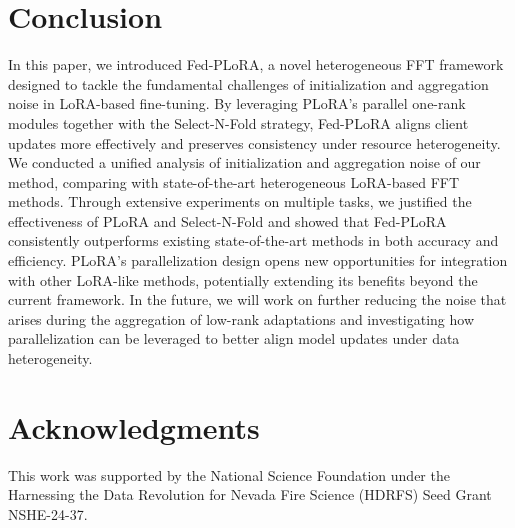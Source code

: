 \documentclass{article} %
\begin{document}
\section{Conclusion}

In this paper, we introduced Fed-PLoRA, a novel heterogeneous FFT framework designed to tackle the fundamental challenges of initialization and aggregation noise in LoRA-based fine-tuning. By leveraging PLoRA’s parallel one-rank modules together with the Select-N-Fold strategy, Fed-PLoRA aligns client updates more effectively and preserves consistency under resource heterogeneity. We conducted a unified analysis of initialization and aggregation noise of our method, comparing with state-of-the-art heterogeneous LoRA-based FFT methods. 
Through extensive experiments on multiple tasks, we justified the effectiveness of PLoRA and Select-N-Fold and showed that Fed-PLoRA consistently outperforms existing state-of-the-art methods in both accuracy and efficiency. PLoRA’s parallelization design opens new opportunities for integration with other LoRA-like methods, potentially extending its benefits beyond the current framework. In the future, we will work on further reducing the noise that arises during the aggregation of low-rank adaptations and investigating how parallelization can be leveraged to better align model updates under data heterogeneity. %


\section*{Acknowledgments}
This work was supported by the National Science Foundation under the Harnessing the Data Revolution for Nevada Fire Science (HDRFS) Seed Grant NSHE-24-37.





\appendix

\end{document}
